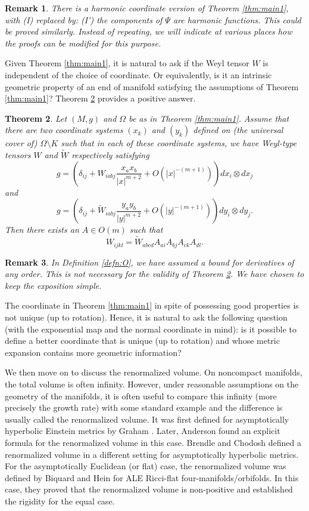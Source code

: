 \documentclass{amsart}
\newtheorem{thm}{Theorem}[section]
\newtheorem{rem}[thm]{Remark}
\newcommand{\abs}[1]{\left\vert#1\right\vert}
\numberwithin{equation}{section}
\begin{document}
\begin{rem}
	There is a harmonic coordinate version of Theorem \ref{thm:main1}, with (I) replaced by: (I') the components of $\Psi$ are harmonic functions. This could be  proved similarly. Instead of repeating, we will indicate at various places how the proofs can be modified for this purpose.
\end{rem}

Given Theorem \ref{thm:main1}, it is natural to ask if the Weyl tensor $W$ is independent of the choice of coordinate. Or equivalently, is it an intrinsic geometric property of an end of manifold satisfying the assumptions of Theorem \ref{thm:main1}? Theorem \ref{thm:main2} provides a positive answer.


\begin{thm}
	\label{thm:main2} Let $(M,g)$ and $\Omega$ be as in Theorem \ref{thm:main1}. Assume that there are two coordinate systems $(x_k)$ and $(y_k)$ defined on (the universal cover of) $\Omega\setminus K$ such that in each of these coordinate systems, we have Weyl-type tensors $W$ and $\tilde{W}$ respectively satisfying  
	\[
		g= (\delta_{ij}+W_{iabj}\frac{x_ax_b}{\abs{x}^{m+2}}+O(\abs{x}^{-(m+1)})) dx_i\otimes dx_j	
	\]
	and
	\[
		g= (\delta_{ij}+\tilde{W}_{iabj}\frac{y_ay_b}{\abs{y}^{m+2}}+O(\abs{y}^{-(m+1)})) dy_i\otimes dy_j.
	\]
	Then there exists an $A\in O(m)$ such that
	\[
		W_{ijkl}=\tilde{W}_{abcd}A_{ai}A_{bj}A_{ck}A_{dl}.
	\]
\end{thm}

\begin{rem}
	In Definition \ref{defn:O}, we have assumed a bound for derivatives of any order. This is not necessary for the validity of Theorem \ref{thm:main2}. We have chosen to keep the exposition simple.
\end{rem}

The coordinate in Theorem \ref{thm:main1} in spite of possessing good properties is not unique (up to rotation). Hence, it is natural to ask the following question (with the exponential map and the normal coordinate in mind): is it possible to define a better coordinate that is unique (up to rotation) and whose metric expansion contains more geometric information?

We then move on to discuss the renormalized volume. On noncompact manifolds, the total volume is often infinity. However, under reasonable assumptions on the geometry of the manifolds, it is often useful to compare this infinity (more precisely the growth rate) with some standard example and the difference is usually called the renormalized volume. It was first defined for asymptotically hyperbolic Einstein metrics by Graham \cite{graham}. Later, Anderson \cite{anderson} found an explicit formula for the renormalized volume in this case. Brendle and Chodosh \cite{brendle} defined a renormalized volume in a different setting for asymptotically hyperbolic metrics. For the asymptotically Euclidean (or flat) case, the renormalized volume was defined by Biquard and Hein \cite{biquard2023renormalized} for ALE Ricci-flat four-manifolds/orbifolds. In this case, they proved that the renormalized volume is non-positive and established the rigidity for the equal case. 
\end{document}
